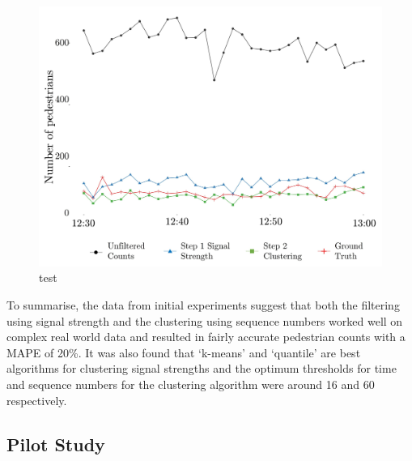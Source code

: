 \begin{figure}
  \includegraphics[trim={3 3 3 3},clip]{images/processing-oxst-results.jpg}
  \caption{test}
  \label{figure:processing:oxst:results}
\end{figure}

To summarise, the data from initial experiments suggest that both the filtering using signal strength and the clustering using sequence numbers worked well on complex real world data and resulted in fairly accurate pedestrian counts with a MAPE of 20\%.
It was also found that `k-means' and `quantile' are best algorithms for clustering signal strengths and the optimum thresholds for time and sequence numbers for the clustering algorithm were around 16 and 60 respectively.

\subsection{Pilot Study}

